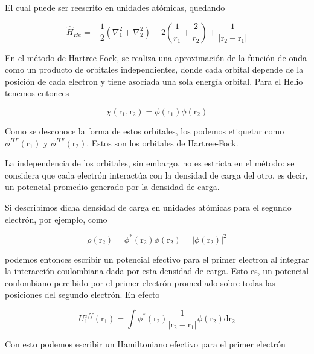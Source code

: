 \documentclass[aps,twocolumn,preprintnumbers]{revtex4}
\begin{document}
  El cual puede ser reescrito en unidades atómicas, quedando

  \begin{equation}
    \hat{H}_{He} = -\frac{1}{2}\left(\nabla_1^2 + \nabla_2^2\right) - 2\left(\frac{1}{r_1} + \frac{2}{r_2}\right) + \frac{1}{|\bm{\mathrm{r}}_2-\bm{\mathrm{r}}_1|}
  \end{equation}

  En el método de Hartree-Fock\cite{udel_hf}, se realiza una aproximación de la función de onda como un producto de orbitales independientes, donde cada orbital depende de la posición de cada electron y tiene asociada una sola energía orbital. Para el Helio tenemos entonces

  \begin{equation}
    \chi(\bm{\mathrm{r}}_1,\bm{\mathrm{r}}_2) = \phi(\bm{\mathrm{r}}_1)\phi(\bm{\mathrm{r}}_2)
  \end{equation}

  Como se desconoce la forma de estos orbitales, los podemos etiquetar como $\phi^{HF}(\bm{\mathrm{r}}_1)$ y $\phi^{HF}(\bm{\mathrm{r}}_2)$. Estos son los orbitales de Hartree-Fock.

  La independencia de los orbitales, sin embargo, no es estricta en el método: se considera que cada electrón interactúa con la densidad de carga del otro, es decir, un potencial promedio generado por la densidad de carga.

  Si describimos dicha densidad de carga en unidades atómicas para el segundo electrón, por ejemplo, como

  \begin{equation}
    \rho(\bm{\mathrm{r}}_2) = \phi^*(\bm{\mathrm{r}}_2) \phi(\bm{\mathrm{r}}_2) = |\phi(\bm{\mathrm{r}}_2)|^2
  \end{equation}

  podemos entonces escribir un potencial efectivo para el primer electron al integrar la interacción coulombiana dada por esta densidad de carga. Esto es, un potencial coulombiano percibido por el primer electrón promediado sobre todas las posiciones del segundo electrón. En efecto

  \begin{equation}
    U_1^{eff}(\bm{\mathrm{r}}_1) = \int\phi^*(\bm{\mathrm{r}}_2)\frac{1}{|\bm{\mathrm{r}}_2-\bm{\mathrm{r}}_1|}\phi(\bm{\mathrm{r}}_2)\mathrm{d}\bm{\mathrm{r}}_2
  \end{equation}

  Con esto podemos escribir un Hamiltoniano efectivo para el primer electrón
\end{document}

